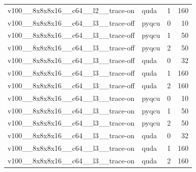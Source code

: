 \begin{table}[htbp]
\begin{tabular}{@{}llrr@{}}
v100\_\_8x8x8x16\_\_c64\_\_l2\_\_trace-on & quda & 1 & 160 \\
v100\_\_8x8x8x16\_\_c64\_\_l3\_\_trace-off & pyqcu & 0 & 10 \\
v100\_\_8x8x8x16\_\_c64\_\_l3\_\_trace-off & pyqcu & 1 & 50 \\
v100\_\_8x8x8x16\_\_c64\_\_l3\_\_trace-off & pyqcu & 2 & 50 \\
v100\_\_8x8x8x16\_\_c64\_\_l3\_\_trace-off & quda & 0 & 32 \\
v100\_\_8x8x8x16\_\_c64\_\_l3\_\_trace-off & quda & 1 & 160 \\
v100\_\_8x8x8x16\_\_c64\_\_l3\_\_trace-off & quda & 2 & 160 \\
v100\_\_8x8x8x16\_\_c64\_\_l3\_\_trace-on & pyqcu & 0 & 10 \\
v100\_\_8x8x8x16\_\_c64\_\_l3\_\_trace-on & pyqcu & 1 & 50 \\
v100\_\_8x8x8x16\_\_c64\_\_l3\_\_trace-on & pyqcu & 2 & 50 \\
v100\_\_8x8x8x16\_\_c64\_\_l3\_\_trace-on & quda & 0 & 32 \\
v100\_\_8x8x8x16\_\_c64\_\_l3\_\_trace-on & quda & 1 & 160 \\
v100\_\_8x8x8x16\_\_c64\_\_l3\_\_trace-on & quda & 2 & 160 \\
\bottomrule
\end{tabular}
\end{table}


